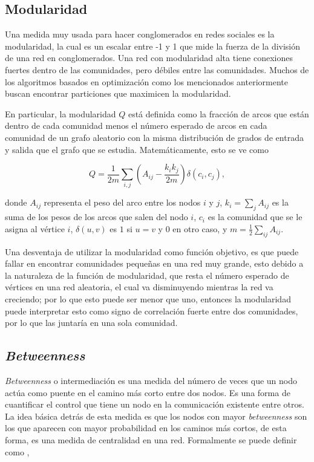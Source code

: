 \documentclass{article}
\begin{document}
\subsection{Modularidad}

Una medida muy usada para hacer conglomerados en redes sociales es la modularidad, la cual es un escalar entre -1 y 1 que mide la fuerza de la división de una red en conglomerados. Una red con modularidad alta tiene conexiones fuertes dentro de las comunidades, pero débiles entre las comunidades. Muchos de los algoritmos basados en optimización como los mencionados anteriormente buscan encontrar particiones que maximicen la modularidad.

En particular, la modularidad $Q$ está definida como la fracción de arcos que están dentro de cada comunidad menos el número esperado de arcos en cada comunidad de un grafo aleatorio con la misma distribución de grados de entrada y salida que el grafo que se estudia. Matemáticamente, esto se ve como\cite{blondel_fast_2008}

\begin{equation}
Q = \frac{1}{2m} \sum_{i,j} (A_{ij} - \frac{k_i k_j}{2m}) \delta (c_i, c_j),
\end{equation}

donde $A_{ij}$ representa el peso del arco entre los nodos $i$ y $j$, $k_i = \sum_j A_{ij}$ es la suma de los pesos de los arcos que salen del nodo $i$, $c_i$ es la comunidad que se le asigna al vértice $i$, $\delta(u,v)$ es $1$ si $u=v$ y $0$ en otro caso, y $m = \frac{1}{2} \sum_{ij} A_{ij}$.

Una desventaja de utilizar la modularidad como función objetivo, es que puede fallar en encontrar comunidades pequeñas en una red muy grande, esto debido a la naturaleza de la función de modularidad, que resta el número esperado de vértices en una red aleatoria, el cual va disminuyendo mientras la red va creciendo; por lo que esto puede ser menor que uno, entonces la modularidad puede interpretar esto como signo de correlación fuerte entre dos comunidades, por lo que las juntaría en una sola comunidad.

\subsection{\textit{Betweenness}}

\textit{Betweenness} o intermediación es una medida del número de veces que un nodo actúa como puente en el camino más corto entre dos nodos. Es una forma de cuantificar el control que tiene  un nodo en la comunicación existente entre otros. La idea básica detrás de esta medida es que los nodos con mayor \textit{betweenness} son los que aparecen con mayor probabilidad en los caminos más cortos, de esta forma, es una medida de centralidad en una red. Formalmente se puede definir como \cite{sun_survey_2011},
\end{document}
